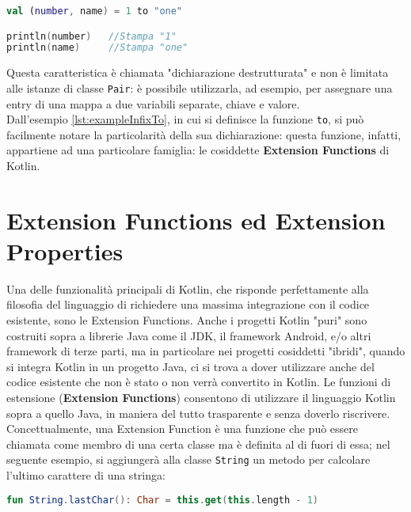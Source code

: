 \begin{lstlisting}[caption={Infix call e destructured declaration}, captionpos=b, label={lst:exampleDestructured}, language=Kotlin]
val (number, name) = 1 to "one"

println(number)   //Stampa "1"
println(name)     //Stampa "one"
\end{lstlisting}

Questa caratteristica è chiamata "dichiarazione destrutturata" e non è limitata alle istanze di classe \texttt{Pair}: è possibile utilizzarla, ad esempio, per assegnare una entry di una mappa a due variabili separate, chiave e valore.\\
Dall'esempio \ref{lst:exampleInfixTo}, in cui si definisce la funzione \texttt{to}, si può facilmente notare la particolarità della sua dichiarazione: questa funzione, infatti, appartiene ad una particolare famiglia: le cosiddette {\bfseries Extension Functions} di Kotlin.\\

\section{Extension Functions ed Extension Properties}
Una delle funzionalità principali di Kotlin, che risponde perfettamente alla filosofia del linguaggio di richiedere una massima integrazione con il codice esistente, sono le Extension Functions. Anche i progetti Kotlin "puri" sono costruiti sopra a librerie Java come il JDK, il framework Android, e/o altri framework di terze parti, ma in particolare nei progetti cosiddetti "ibridi", quando si integra Kotlin in un progetto Java, ci si trova a dover utilizzare anche del codice esistente che non è stato o non verrà convertito in Kotlin. Le funzioni di estensione ({\bfseries Extension Functions}) consentono di utilizzare il linguaggio Kotlin sopra a quello Java, in maniera del tutto trasparente e senza doverlo riscrivere. Concettualmente, una Extension Function è una funzione che può essere chiamata come membro di una certa classe ma è definita al di fuori di essa; nel seguente esempio, si aggiungerà alla classe \texttt{String} un metodo per calcolare l’ultimo carattere di una stringa:\\
\begin{lstlisting}[caption={Definizione di una Extension Function}, captionpos=b, label={lst:exampleExtrnsionF}, language=Kotlin]
fun String.lastChar(): Char = this.get(this.length - 1)
\end{lstlisting}

